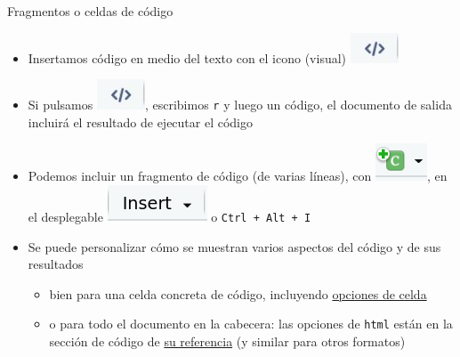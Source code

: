 \documentclass[
  10pt,
  ignorenonframetext,
]{beamer}
\begin{document}
\begin{frame}[fragile]{Fragmentos o celdas de código }
\label{fragmentos-o-celdas-de-cuxf3digo}
\begin{itemize}
\item
  Insertamos código en medio del texto con el icono (visual)
  \includegraphics{figure/Code.jpg}
\item
  Si pulsamos \includegraphics{figure/Code.jpg}, escribimos \texttt{r} y
  luego un código, el documento de salida incluirá el resultado de
  ejecutar el código
\end{itemize}

\pause

\begin{itemize}
\item
  Podemos incluir un fragmento de código (de varias líneas), con
  \includegraphics{figure/Insert_codechunk.png}, en el desplegable
  \includegraphics{figure/InsertVisual.png} o
  \texttt{Ctrl\ +\ Alt\ +\ I}
\item
  Se puede personalizar cómo se muestran varios aspectos del código y de
  sus resultados

  \begin{itemize}
  \item
    bien para una celda concreta de código, incluyendo
    \href{https://quarto.org/docs/reference/cells/cells-knitr.html}{opciones
    de celda}
  \item
    o para todo el documento en la cabecera: las opciones de
    \texttt{html} están en la sección de código de
    \href{https://quarto.org/docs/reference/formats/html.html}{su
    referencia} (y similar para otros formatos)
  \end{itemize}
\end{itemize}
\end{frame}
\end{document}
